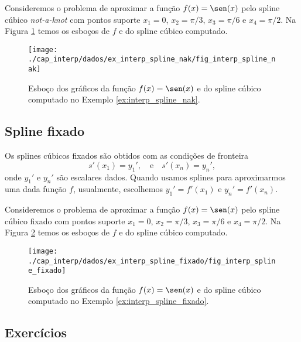 \begin{ex}\label{ex:interp_spline_nak}
  Consideremos o problema de aproximar a função $f(x)=\sen(x)$ pelo spline cúbico {\it not-a-knot} com pontos suporte $x_1=0$, $x_2=\pi/3$, $x_3=\pi/6$ e $x_4=\pi/2$. Na Figura \ref{fig:interp_spline_nak} temos os esboços de $f$ e do spline cúbico computado.

  \begin{figure}[h!]
    \centering
    \texttt{[image: ./cap\_interp/dados/ex\_interp\_spline\_nak/fig\_interp\_spline\_nak]}
    \caption{Esboço dos gráficos da função $f(x)=\sen(x)$ e do spline cúbico computado no Exemplo \ref{ex:interp_spline_nak}.}
    \label{fig:interp_spline_nak}
  \end{figure}

% 
\end{ex}

\subsection{Spline fixado}

Os splines cúbicos fixados são obtidos com as condições de fronteira
\begin{equation}
  s'(x_1)=y_1',\quad\text{e}\quad s'(x_n)=y_n',
\end{equation}
onde $y_1'$ e $y_n'$ são escalares dados. Quando usamos splines para aproximarmos uma dada função $f$, usualmente, escolhemos $y_1'=f'(x_1)$ e $y_n'=f'(x_n)$.

\begin{ex}\label{ex:interp_spline_fixado}
  Consideremos o problema de aproximar a função $f(x)=\sen(x)$ pelo spline cúbico fixado com pontos suporte $x_1=0$, $x_2=\pi/3$, $x_3=\pi/6$ e $x_4=\pi/2$. Na Figura \ref{fig:interp_spline_fixado} temos os esboços de $f$ e do spline cúbico computado.

  \begin{figure}[h!]
    \centering
    \texttt{[image: ./cap\_interp/dados/ex\_interp\_spline\_fixado/fig\_interp\_spline\_fixado]}
    \caption{Esboço dos gráficos da função $f(x)=\sen(x)$ e do spline cúbico computado no Exemplo \ref{ex:interp_spline_fixado}.}
    \label{fig:interp_spline_fixado}
  \end{figure}

% 
\end{ex}

\subsection*{Exercícios}

\emconstrucao

